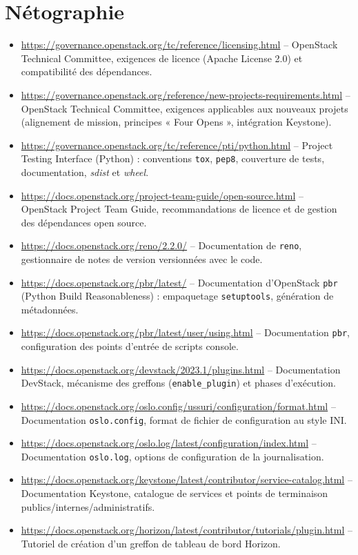 \documentclass[a4paper,11pt,oneside]{report}
\begin{document}
\section*{Nétographie}
\begin{itemize}
\item \url{https://governance.openstack.org/tc/reference/licensing.html} -- OpenStack Technical Committee, exigences de licence (Apache License 2.0) et compatibilité des dépendances.
\item \url{https://governance.openstack.org/reference/new-projects-requirements.html} -- OpenStack Technical Committee, exigences applicables aux nouveaux projets (alignement de mission, principes « Four Opens », intégration Keystone).
\item \url{https://governance.openstack.org/tc/reference/pti/python.html} -- Project Testing Interface (Python) : conventions \texttt{tox}, \texttt{pep8}, couverture de tests, documentation, \emph{sdist} et \emph{wheel}.
\item \url{https://docs.openstack.org/project-team-guide/open-source.html} -- OpenStack Project Team Guide, recommandations de licence et de gestion des dépendances open source.
\item \url{https://docs.openstack.org/reno/2.2.0/} -- Documentation de \texttt{reno}, gestionnaire de notes de version versionnées avec le code.
\item \url{https://docs.openstack.org/pbr/latest/} -- Documentation d'OpenStack \texttt{pbr} (Python Build Reasonableness) : empaquetage \texttt{setuptools}, génération de métadonnées.
\item \url{https://docs.openstack.org/pbr/latest/user/using.html} -- Documentation \texttt{pbr}, configuration des points d'entrée de scripts console.
\item \url{https://docs.openstack.org/devstack/2023.1/plugins.html} -- Documentation DevStack, mécanisme des greffons (\texttt{enable\_plugin}) et phases d'exécution.
\item \url{https://docs.openstack.org/oslo.config/ussuri/configuration/format.html} -- Documentation \texttt{oslo.config}, format de fichier de configuration au style INI.
\item \url{https://docs.openstack.org/oslo.log/latest/configuration/index.html} -- Documentation \texttt{oslo.log}, options de configuration de la journalisation.
\item \url{https://docs.openstack.org/keystone/latest/contributor/service-catalog.html} -- Documentation Keystone, catalogue de services et points de terminaison publics/internes/administratifs.
\item \url{https://docs.openstack.org/horizon/latest/contributor/tutorials/plugin.html} -- Tutoriel de création d'un greffon de tableau de bord Horizon.
\end{itemize}
\end{document}
